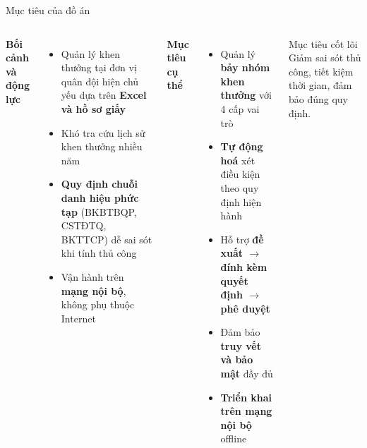 \documentclass[aspectratio=43,xcolor=table]{beamer}
\newcommand{\highlight}[1]{\textcolor{hustred}{\textbf{#1}}}
\begin{document}
\begin{frame}{Mục tiêu của đồ án}
  \begin{columns}[T,onlytextwidth]
    \textbf{Bối cảnh và động lực}
    \begin{itemize}\small
      \item Quản lý khen thưởng tại đơn vị quân đội hiện chủ yếu dựa trên \textbf{Excel và hồ sơ giấy}
      \item Khó tra cứu lịch sử khen thưởng nhiều năm
      \item \highlight{Quy định chuỗi danh hiệu phức tạp} (BKBTBQP, CSTĐTQ, BKTTCP) dễ sai sót khi tính thủ công
      \item Vận hành trên \textbf{mạng nội bộ}, không phụ thuộc Internet
    \end{itemize}

    \textbf{Mục tiêu cụ thể}
    \begin{itemize}\small
      \item Quản lý \textbf{bảy nhóm khen thưởng} với 4 cấp vai trò
      \item \textbf{Tự động hoá} xét điều kiện theo quy định hiện hành
      \item Hỗ trợ \textbf{đề xuất $\to$ đính kèm quyết định $\to$ phê duyệt}
      \item Đảm bảo \textbf{truy vết và bảo mật} đầy đủ
      \item \textbf{Triển khai trên mạng nội bộ} offline
    \end{itemize}
    \begin{block}{Mục tiêu cốt lõi}
      \small Giảm sai sót thủ công, tiết kiệm thời gian, đảm bảo đúng quy định.
    \end{block}
  \end{columns}
\end{frame}
\end{document}
